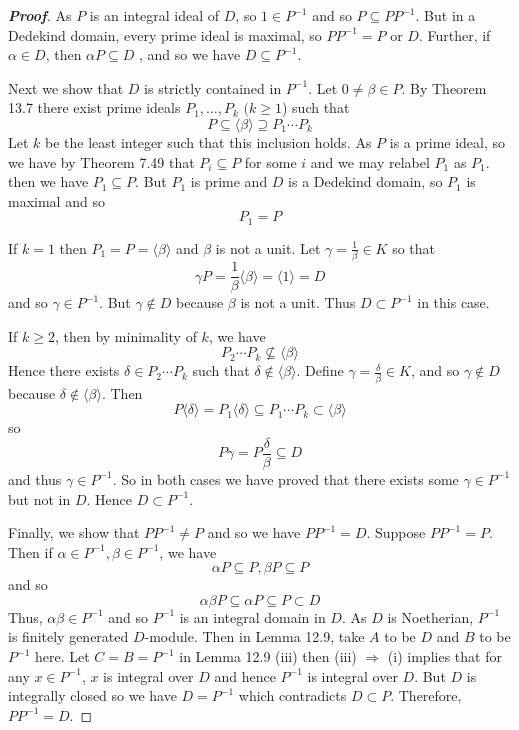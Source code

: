 \begin{proof}[\bf Proof] As $P$ is an integral ideal of $D$, so $1 \in P^{-1}$ and so $P \subseteq PP^{-1}$. But in a Dedekind domain, every prime ideal is maximal, so $PP^{-1}=P$ or $D$. Further, if $\alpha \in D$, then $\alpha P \subseteq D$ , and so we have $D \subseteq P^{-1}$.

Next we show that $D$ is strictly contained in $P^{-1}$. Let $0 \neq \beta \in P$. By Theorem 13.7 there exist
prime ideals $P_1,\ldots,P_k$ $(k \ge 1$) such that
$$P \subseteq \langle \beta \rangle \supseteq P_1\cdots P_k$$
Let $k$ be the least integer such that this inclusion holds. As $P$ is a prime ideal, so we have
by Theorem 7.49 that $P_i \subseteq P$ for some $i$ and we may relabel $P_1$ as $P_1$. then we have
$P_1 \subseteq P$. But $P_1$ is prime and $D$ is a Dedekind domain, so $P_1$ is maximal and so
$$P_1=P$$

If $k=1$ then $P_1=P=\langle \beta \rangle$ and $\beta$ is not a unit.
Let $\gamma =\frac{1}{\beta} \in K$ so that
$$\gamma P=\frac{1}{\beta} \langle \beta \rangle = \langle 1 \rangle =D$$
and so $\gamma \in P^{-1}$. But $\gamma \not \in D$ because $\beta$ is not a unit. Thus $D \subset P^{-1}$ in this case.

If $k \ge 2$, then by minimality of $k$, we have
$$P_2 \cdots P_k \not \subseteq \langle \beta \rangle$$
Hence there exists $\delta \in P_2\cdots P_k$ such that $\delta \not \in \langle \beta \rangle$.
Define $\gamma =\frac{\delta}{\beta} \in K$, and so $\gamma \not \in D$ because $\delta \not \in \langle \beta \rangle$. Then
$$P \langle \delta \rangle =P_1 \langle \delta \rangle \subseteq P_1 \cdots P_k \subset \langle \beta \rangle$$
so
$$P\gamma=P \frac{\delta}{\beta} \subseteq D$$
and thus $\gamma \in P^{-1}$. So in both cases we have proved that there exists some $\gamma \in P^{-1}$ but not in $D$. Hence $D \subset P^{-1}$.

Finally, we show that $PP^{-1} \neq P$ and so we have $PP^{-1}=D$. Suppose $PP^{-1}=P$.
Then if $\alpha \in P^{-1}, \beta \in P^{-1}$, we have
$$\alpha P \subseteq P, \beta P \subseteq P$$
and so
$$\alpha \beta P \subseteq \alpha P \subseteq P \subset D$$
Thus, $\alpha \beta \in P^{-1}$ and so $P^{-1}$ is an integral domain in $D$. As $D$ is Noetherian, $P^{-1}$ is finitely generated $D$-module. Then in Lemma 12.9, take $A$ to be $D$ and $B$ to be $P^{-1}$ here. Let $C=B=P^{-1}$ in Lemma 12.9 (iii) then (iii) $\Rightarrow$ (i) implies that for any $x \in P^{-1}$, $x$ is integral over $D$ and hence $P^{-1}$ is integral over $D$. But $D$ is integrally closed so we have $D=P^{-1}$ which contradicts $D \subset P$. Therefore, $PP^{-1}=D$.
\end{proof}

